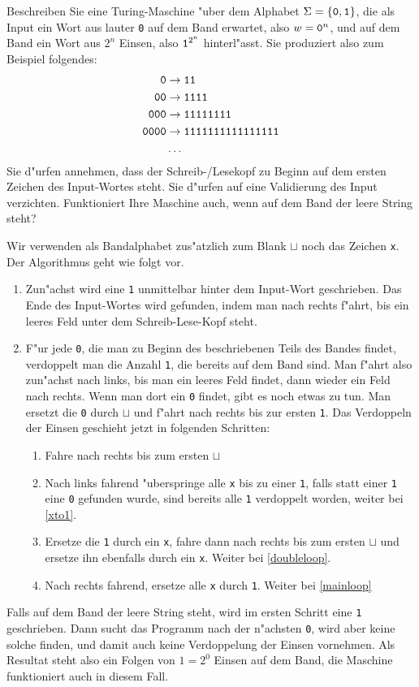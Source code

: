 Beschreiben Sie eine Turing-Maschine "uber dem Alphabet
$\Sigma=\{\text{\tt 0},\text{\tt 1}\}$, die als Input ein Wort
aus lauter {\tt 0} auf dem Band erwartet, also $w=\text{\tt 0}^n$,
und auf dem Band ein Wort aus $2^n$ Einsen, also $\text{\tt 1}^{2^n}$ hinterl"asst. Sie
produziert also zum Beispiel folgendes:
\begin{align*}
\text{\tt 0}&\rightarrow\text{\tt 11}\\
\text{\tt 00}&\rightarrow\text{\tt 1111}\\
\text{\tt 000}&\rightarrow\text{\tt 11111111}\\
\text{\tt 0000}&\rightarrow\text{\tt 1111111111111111}\\
&\dots
\end{align*}
Sie d"urfen annehmen, dass der Schreib-/Lesekopf zu Beginn auf dem
ersten Zeichen des Input-Wortes steht. Sie d"urfen auf eine
Validierung des Input verzichten. Funktioniert Ihre Maschine auch,
wenn auf dem Band der leere String steht?

\begin{loesung}
Wir verwenden als Bandalphabet zus"atzlich zum Blank $\sqcup$ noch
das Zeichen {\tt x}. Der Algorithmus geht wie folgt vor.
\begin{enumerate}
\item Zun"achst
wird eine {\tt 1} unmittelbar hinter dem Input-Wort geschrieben.
Das Ende des Input-Wortes wird gefunden, indem man nach rechts f"ahrt,
bis ein leeres Feld unter dem Schreib-Lese-Kopf steht.
\item \label{mainloop}F"ur jede {\tt 0}, die man zu Beginn des beschriebenen
Teils des Bandes findet, verdoppelt man die Anzahl {\tt 1}, die
bereits auf dem Band sind. Man f"ahrt also zun"achst nach links,
bis man ein leeres Feld findet, dann wieder ein Feld nach rechts.
Wenn man dort ein {\tt 0} findet, gibt es noch etwas zu tun. Man
ersetzt die {\tt 0} durch $\sqcup$ und f"ahrt nach rechts bis
zur ersten {\tt 1}. Das Verdoppeln der Einsen geschieht jetzt in
folgenden Schritten:
\begin{enumerate}
\item Fahre nach rechts bis zum ersten $\sqcup$
\item \label{doubleloop}Nach links fahrend "uberspringe alle {\tt x} bis zu einer {\tt 1},
falls statt einer {\tt 1} eine {\tt 0} gefunden wurde, sind bereits alle
{\tt 1} verdoppelt worden, weiter bei \ref{xto1}.
\item Ersetze die {\tt 1} durch ein
{\tt x}, fahre dann nach rechts bis zum ersten $\sqcup$ und ersetze
ihn ebenfalls durch ein {\tt x}. Weiter bei \ref{doubleloop}.
\item \label{xto1}Nach rechts fahrend, ersetze alle {\tt x} durch {\tt 1}.
Weiter bei \ref{mainloop}
\end{enumerate}
\end{enumerate}
Falls auf dem Band der leere String steht, wird im ersten Schritt eine
{\tt 1} geschrieben. Dann sucht das Programm nach der n"achsten {\tt 0},
wird aber keine solche finden, und damit auch keine Verdoppelung der
Einsen vornehmen. Als Resultat steht also ein Folgen von $1=2^0$ Einsen
auf dem Band, die Maschine funktioniert auch in diesem Fall.
\end{loesung}
